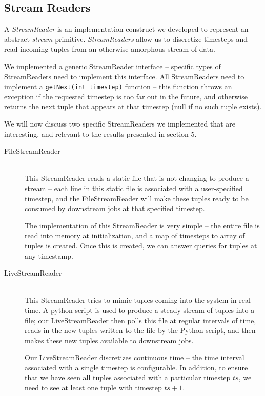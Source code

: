 \documentclass[a4paper, 10pt, conference]{IEEEconf}
\begin{document}
\subsection{Stream Readers}
A \textit{StreamReader} is an implementation construct we developed to represent an abstract \textit{stream} primitive. \textit{StreamReaders} allow us to discretize timesteps and read incoming tuples from an otherwise amorphous stream of data.

We implemented a generic StreamReader interface -- specific types of StreamReaders need to implement this interface. All StreamReaders need to implement a \texttt{getNext(int timestep)} function -- this function throws an exception if the requested timestep is too far out in the future, and otherwise returns the next tuple that appears at that timestep (null if no such tuple exists).

We will now discuss two specific StreamReaders we implemented that are interesting, and relevant to the results presented in section $5$.

\begin{description}
  \item[FileStreamReader] \hfill \\
  This StreamReader reads a static file that is not changing to produce a stream -- each line in this static file is associated with a user-specified timestep, and the FileStreamReader will make these tuples ready to be consumed by downstream jobs at that specified timestep.
  
  The implementation of this StreamReader is very simple -- the entire file is read into memory at initialization, and a map of timesteps to array of tuples is created. Once this is created, we can answer queries for tuples at any timestamp.
  
  \item[LiveStreamReader] \hfill \\
  This StreamReader tries to mimic tuples coming into the system in real time. A python script is used to produce a steady stream of tuples into a file; our LiveStreamReader then polls this file at regular intervals of time, reads in the new tuples written to the file by the Python script, and then makes these new tuples available to downstream jobs.

  Our LiveStreamReader discretizes continuous time -- the time interval associated with a single timestep is configurable. In addition, to ensure that we have seen all tuples associated with a particular timestep $ts$, we need to see at least one tuple with timestep $ts + 1$.
\end{description}
\end{document}
